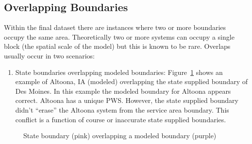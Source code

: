 \documentclass[
  letterpaper,
  DIV=11,
  numbers=noendperiod,
  oneside]{scrartcl}
\providecommand{\tightlist}{%
  \setlength{\itemsep}{0pt}\setlength{\parskip}{0pt}}\usepackage{longtable,booktabs,array}
\begin{document}
\subsection{Overlapping Boundaries}\label{overlapping-boundaries}

Within the final dataset there are instances where two or more
boundaries occupy the same area. Theoretically two or more systems can
occupy a single block (the spatial scale of the model) but this is known
to be rare. Overlaps usually occur in two scenarios:

\begin{enumerate}
\def\labelenumi{\arabic{enumi}.}
\tightlist
\item
  State boundaries overlapping modeled boundaries:
  Figure~\ref{fig-overlap1} shows an example of Altoona, IA (modeled)
  overlapping the state supplied boundary of Des Moines. In this example
  the modeled boundary for Altoona appears correct. Altoona has a unique
  PWS. However, the state supplied boundary didn't ``erase'' the Altoona
  system from the service area boundary. This conflict is a function of
  course or inaccurate state supplied boundaries.
\end{enumerate}

\begin{figure}


\caption{\label{fig-overlap1}State boundary (pink) overlapping a modeled
boundary (purple)}

\end{figure}%
\end{document}
